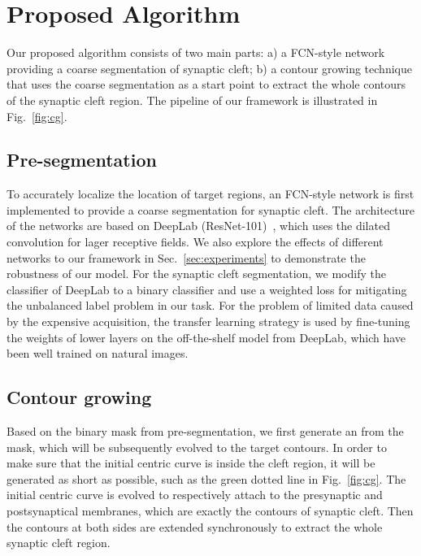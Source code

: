 \section{Proposed Algorithm}
\label{sec:algorithm}


Our proposed algorithm consists of two main parts:
a) a FCN-style network providing a coarse segmentation of synaptic cleft;
b) a contour growing technique that uses the coarse segmentation as a start point to extract the whole contours of the synaptic cleft region.
The pipeline of our framework is illustrated in Fig.~\ref{fig:cg}.

\subsection{Pre-segmentation}

To accurately localize the location of target regions, an FCN-style network is first implemented to provide a coarse segmentation for synaptic cleft.
The architecture of the networks are based on DeepLab (ResNet-101)~\cite{Chen2016a}, which uses the dilated convolution for lager receptive fields. 
%
We also explore the effects of different networks to our framework in Sec.~\ref{sec:experiments} to demonstrate the robustness of our model.
%
For the synaptic cleft segmentation, we modify the classifier of DeepLab to a binary classifier and use a weighted loss for mitigating the unbalanced label problem in our task.
For the problem of limited data caused by the expensive acquisition, the transfer learning strategy is used by fine-tuning the weights of lower layers on the off-the-shelf model from DeepLab, which have been well trained on natural images.




\subsection{Contour growing}

Based on the binary mask from pre-segmentation, we first generate an  from the mask, which will be subsequently evolved to the target contours.
%
In order to make sure that the initial centric curve is inside the cleft region, it will be generated as short as possible, such as the green dotted line in Fig.~\ref{fig:cg}.
%
The initial centric curve is evolved to respectively attach to the presynaptic and postsynaptical membranes, which are exactly the contours of synaptic cleft.
%
Then the contours at both sides are extended synchronously to extract the whole synaptic cleft region.
 



